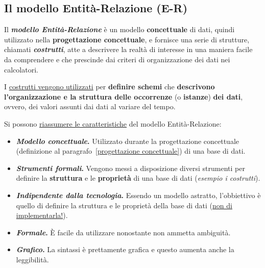 \documentclass[a4paper]{article}
\begin{document}
	\newpage
	
	
	
	
	\subsection{Il modello Entità-Relazione (E-R)}\label{Il modello Entità-Relazione (E-R)}
	
	Il \textcolor{Red3}{\textbf{\emph{modello Entità-Relazione}}} è un modello \textbf{concettuale} di dati, quindi utilizzato nella \textbf{progettazione concettuale}, e fornisce una serie di strutture, chiamati \textbf{\emph{costrutti}}, atte a descrivere la realtà di interesse in una maniera facile da comprendere e che prescinde dai criteri di organizzazione dei dati nei calcolatori.
	
	I \underline{costrutti vengono utilizzati} per \textbf{definire schemi} che \textbf{descrivono l'organizzazione e la struttura delle occorrenze} (o \textbf{istanze}) \textbf{dei dati}, ovvero, dei valori assunti dai dati al variare del tempo.
	
	\noindent
	Si possono \underline{riassumere le caratteristiche} del modello Entità-Relazione:
	
	\begin{itemize}
		\item[\ding{42}] \textcolor{SpringGreen4}{\textbf{\emph{Modello concettuale}.}} Utilizzato durante la progettazione concettuale (definizione al paragrafo~\ref{progettazione concettuale}) di una base di dati.
		
		\item[\ding{42}] \textcolor{SpringGreen4}{\textbf{\emph{Strumenti formali}.}} Vengono messi a disposizione diversi strumenti per definire la \textbf{struttura} e le \textbf{proprietà} di una base di dati (\emph{esempio i costrutti}).
		
		\item[\ding{42}] \textcolor{SpringGreen4}{\textbf{\emph{Indipendente dalla tecnologia}.}} Essendo un modello astratto, l'obbiettivo è quello di definire la struttura e le proprietà della base di dati (\underline{non di implementarla!}).
		
		\item[\ding{42}] \textcolor{SpringGreen4}{\textbf{\emph{Formale}.}} È facile da utilizzare nonostante non ammetta ambiguità.
		
		\item[\ding{42}] \textcolor{SpringGreen4}{\textbf{\emph{Grafico}.}} La sintassi è prettamente grafica e questo aumenta anche la leggibilità.
	\end{itemize}
\end{document}
